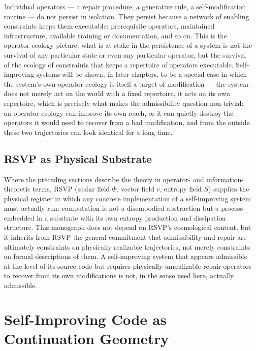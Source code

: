 \documentclass[11pt]{book}
\begin{document}
Individual operators --- a repair procedure, a generative rule, a self-modification routine --- do not persist in isolation. They persist because a network of enabling constraints keeps them executable: prerequisite operators, maintained infrastructure, available training or documentation, and so on. This is the operator-ecology picture: what is at stake in the persistence of a system is not the survival of any particular state or even any particular operator, but the survival of the ecology of constraints that keeps a repertoire of operators executable. Self-improving systems will be shown, in later chapters, to be a special case in which the system's own operator ecology is itself a target of modification --- the system does not merely act on the world with a fixed repertoire, it acts on its own repertoire, which is precisely what makes the admissibility question non-trivial: an operator ecology can improve its own reach, or it can quietly destroy the operators it would need to recover from a bad modification, and from the outside these two trajectories can look identical for a long time.

\section{RSVP as Physical Substrate}

Where the preceding sections describe the theory in operator- and information-theoretic terms, RSVP (scalar field $\Phi$, vector field $v$, entropy field $S$) supplies the physical register in which any concrete implementation of a self-improving system must actually run: computation is not a disembodied abstraction but a process embedded in a substrate with its own entropy production and dissipation structure. This monograph does not depend on RSVP's cosmological content, but it inherits from RSVP the general commitment that admissibility and repair are ultimately constraints on physically realizable trajectories, not merely constraints on formal descriptions of them. A self-improving system that appears admissible at the level of its source code but requires physically unrealizable repair operators to recover from its own modifications is not, in the sense used here, actually admissible.

\chapter{Self-Improving Code as Continuation Geometry}
\label{ch:continuation}
\end{document}
